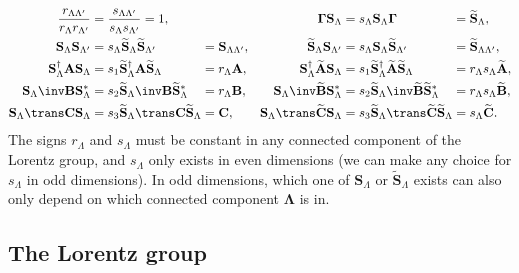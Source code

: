 \documentclass[11pt]{article}
\newcommand{\Gammab}{\boldsymbol{\Gamma}}
\renewcommand{\S}{\mathbf{S}}
\newcommand{\A}{\mathbf{A}}
\newcommand{\B}{\mathbf{B}}
\renewcommand{\C}{\mathbf{C}}
\newcommand{\At}{\widetilde{\A}}
\newcommand{\Bt}{\widetilde{\B}}
\newcommand{\Ct}{\widetilde{\C}}
\newcommand{\St}{\widetilde{\S}}
\newcommand{\Lambdab}{\boldsymbol{\Lambda}}
\begin{document}
\begin{equation}\label{eq:constnormlorentz}
\begin{alignedat}{4}
  \frac{r_{\Lambda\Lambda'}}{r_{\Lambda} r_{\Lambda'}}
    &= \frac{s_{\Lambda\Lambda'}}{s_{\Lambda} s_{\Lambda'}} 
    = 1, &&&
  \Gammab \S_\Lambda 
    &= s_\Lambda \S_\Lambda \Gammab &
    &= \St_\Lambda, \\
  \S_\Lambda \S_{\Lambda'} 
    &= s_{\Lambda} \St_\Lambda \St_{\Lambda'} &
    &= \S_{\Lambda\Lambda'}, &
  \St_\Lambda \S_{\Lambda'}
    &= s_{\Lambda} \S_\Lambda \St_{\Lambda'} &
    &= \St_{\Lambda\Lambda'}, \\ 
  \S_\Lambda^\dag \A \S_\Lambda 
    &= s_1 \St_\Lambda^\dag \A \St_\Lambda &
    &= r_\Lambda \A, &
  \S_\Lambda^\dag \At \S_\Lambda 
    &= s_1 \St_\Lambda^\dag \At \St_\Lambda &
    &= r_\Lambda s_\Lambda \At, \\
  \S_\Lambda\inv \B \S_\Lambda^\ast 
    &= s_2 \St_\Lambda\inv \B \St_\Lambda^\ast &
    &= r_\Lambda \B, &\qquad
  \S_\Lambda\inv \Bt \S_\Lambda^\ast 
    &= s_2 \St_\Lambda\inv \Bt \St_\Lambda^\ast &
    &= r_\Lambda s_\Lambda \Bt, \\ 
  \S_\Lambda\trans \C \S_\Lambda 
    &= s_3 \St_\Lambda\trans \C \St_\Lambda &
    &= \C, & 
  \S_\Lambda\trans \Ct \S_\Lambda 
    &= s_3 \St_\Lambda\trans \Ct \St_\Lambda &
    &= s_\Lambda \Ct. 
\end{alignedat}
\end{equation}
%
The signs \(r_\Lambda\) and \(s_\Lambda\) must be constant in any connected component of the Lorentz group,
and \(s_\Lambda\) only exists in even dimensions 
(we can make any choice for \(s_\Lambda\)  in odd dimensions).
In odd dimensions, which one of \(\S_\Lambda\) or \(\St_\Lambda\) exists can also only depend on which connected component \(\Lambdab\) is in.
  

\subsection{The Lorentz group}\label{sec:group}
\end{document}
